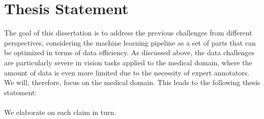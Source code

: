 \section{Thesis Statement}
The goal of this dissertation is to address the previous challenges from different perspectives, considering the machine learning pipeline as a set of parts that can be optimized in terms of data efficiency. As discussed above, the data challenges are particularly severe in vision tasks applied to the medical domain, where the amount of data is even more limited due to the necessity of expert annotators. We will, therefore, focus on the medical domain. This leads to the following thesis statement:
\\%

\textit{}
\\

We elaborate on each claim in turn.